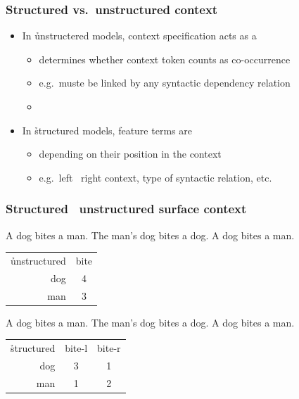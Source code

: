 \documentclass[t]{beamer} %
\begin{document}
\begin{frame}[c]
  \frametitle{Structured vs.\ unstructured context}

  \begin{itemize}
  \item In \h{unstructered} models, context specification acts as a 
    \begin{itemize}
    \item determines whether context token counts as co-occurrence
    \item e.g.\ muste be linked by any syntactic dependency relation
    \item[]
    \end{itemize}
    \pause
  \item In \h{structured} models, feature terms are 
    \begin{itemize}
    \item depending on their position in the context
    \item e.g.\ left \vs\ right context, type of syntactic relation, etc.
    \end{itemize}
  \end{itemize}
\end{frame}

\begin{frame}
  \frametitle{Structured \vs\ unstructured surface context}

  A dog bites a man. The man's dog bites a dog.  A dog bites a man.
  
 \begin{center}
    \begin{tabular}{r|c}
      \h{unstructured} &  bite \\
      dog & 4 \\
      man & 3 
    \end{tabular}
  \end{center}

  \gap[2]\pause
  A dog bites a man. The man's dog bites a dog.  A dog bites a man.
  
  \begin{center}
    \begin{tabular}{r|c|c}
      \h{structured} &  bite-l & bite-r \\
      dog & 3 & 1 \\
      man & 1  & 2
    \end{tabular}
  \end{center}
\end{frame}
\end{document}
